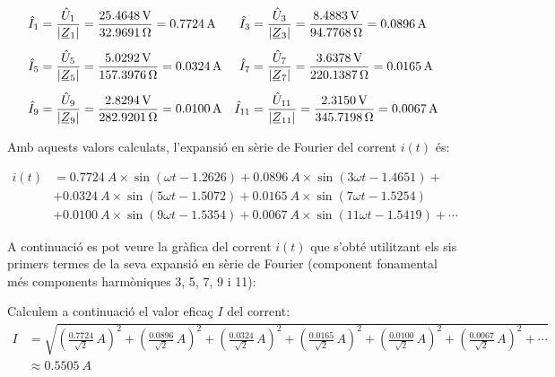 \begin{exemple}
    \begin{align*}
        \hat{I}_1 &= \frac{\hat{U}_1}{|\cmplx{Z}_1|} = \frac{\qty{25,4648}{V}}{\qty{32,9691}{\ohm}} = \qty{0,7724}{A}
        & \hat{I}_3 &= \frac{\hat{U}_3}{|\cmplx{Z}_3|} =\frac{\qty{8,4883}{V}}{\qty{94,7768}{\ohm}} = \qty{0,0896}{A}\\[1ex]
        \hat{I}_5 &= \frac{\hat{U}_5}{|\cmplx{Z}_5|} =\frac{\qty{5,0292}{V}}{\qty{157,3976}{\ohm}} =\qty{0,0324}{A}
        & \hat{I}_7 &= \frac{\hat{U}_7}{|\cmplx{Z}_7|} =\frac{\qty{3,6378}{V}}{\qty{220,1387}{\ohm}} =
        \qty{0,0165}{A}\\[1ex]
        \hat{I}_9 &= \frac{\hat{U}_9}{|\cmplx{Z}_9|} =\frac{\qty{2,8294}{V}}{\qty{282,9201}{\ohm}} =
        \qty{0,0100}{A} & \hat{I}_{11} &= \frac{\hat{U}_{11}}{|\cmplx{Z}_{11}|} =\frac{\qty{2,3150}{V}}
        {\qty{345,7198}{\ohm}} =  \qty{0,0067}{A}
    \end{align*}

    Amb aquests valors calculats, l'expansió en sèrie de Fourier del
    corrent $i(t)$ és:
    
    \[\begin{split}
         i(t) &=  \qty{0,7724}{A} \times \sin(\omega t - \num{1,2626}) +  \qty{0,0896}{A} \times \sin(3 \omega t -
         \num{1,4651}) + \\
         &+ \qty{0,0324}{A} \times \sin(5 \omega t - \num{1,5072}) +
          \qty{0,0165}{A} \times \sin(7 \omega t - \num{1,5254}) \\
          &+ \qty{0,0100}{A} \times \sin(9 \omega t - \num{1,5354})
         + \qty{0,0067}{A} \times \sin(11 \omega t - \num{1,5419}) +\cdots
    \end{split}\]

    A continuació es pot veure la gràfica del corrent $i(t)$ que
    s'obté utilitzant els sis primers termes de la seva expansió en
    sèrie de Fourier (component fonamental més components harmòniques 3, 5, 7, 9 i 11):

    \begin{center}
      
    \end{center}

    Calculem a continuació el valor eficaç $I$ del corrent:
    \[\begin{split}
        I &= \sqrt{\left(\tfrac{\num{0,7724}}{\sqrt{2}}\unit{\,A}\right)^2 +
            \left(\tfrac{\num{0,0896}}{\sqrt{2}}\unit{\,A}\right)^2 +
            \left(\tfrac{\num{0,0324}}{\sqrt{2}}\unit{\,A}\right)^2 +
            \left(\tfrac{\num{0,0165}}{\sqrt{2}}\unit{\,A}\right)^2 +
            \left(\tfrac{\num{0,0100}}{\sqrt{2}}\unit{\,A}\right)^2 +
            \left(\tfrac{\num{0,0067}}{\sqrt{2}}\unit{\,A}\right)^2 + \cdots}
             \\[1ex]
            &\approx \qty{0,5505}{A}
    \end{split}\]


\end{exemple}
